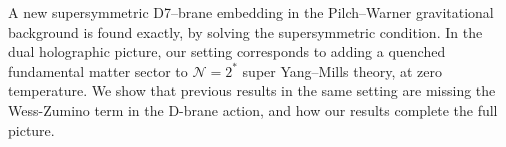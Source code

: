 A new supersymmetric D7–brane embedding in the Pilch–Warner gravitational background is found exactly, by solving the supersymmetric condition. 
In the dual holographic picture, our setting corresponds to adding a quenched fundamental matter sector to  $\mathcal{N}=2^*$  super Yang–Mills theory, at zero temperature. We show that previous results in the same setting are missing the Wess-Zumino term in the D-brane action, and how our results complete the full picture.
